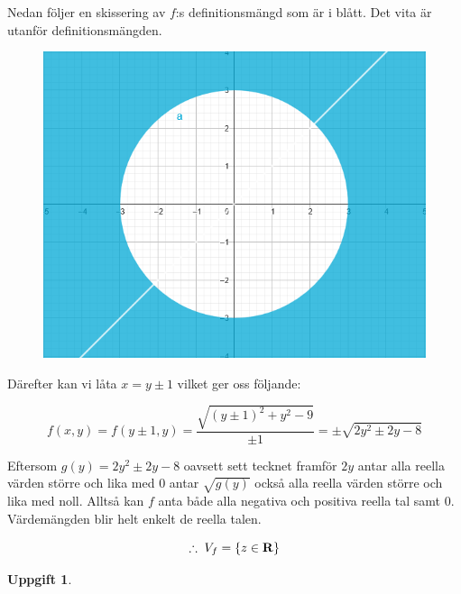 \documentclass{article}
\newtheorem{thr}{Uppgift}
\begin{document}
Nedan följer en skissering av $f$:s definitionsmängd som är i blått. Det vita är utanför definitionsmängden.

\begin{figure}[h]
    \center
    \includegraphics[scale=0.43]{./images/domain}
\end{figure}

Därefter kan vi låta $x=y\pm1$ vilket ger oss följande:

$$
f(x, y)=f(y\pm1, y)=\frac{\sqrt{(y\pm1)^2+y^2-9}}{\pm1}=\pm\sqrt{2y^2\pm2y-8}
$$

Eftersom $g(y)=2y^2\pm2y-8$ oavsett sett tecknet framför $2y$ antar alla reella värden större och lika med 0 antar $\sqrt{g(y)}$ också alla reella värden större och lika med noll. Alltså kan $f$ anta både alla negativa och positiva reella tal samt 0. Värdemängden blir helt enkelt de reella talen.

$$
\therefore\; V_{f}=\{z\in\mathbf{R}\}
$$

\newpage

\begin{thr}
\end{thr}
\end{document}
